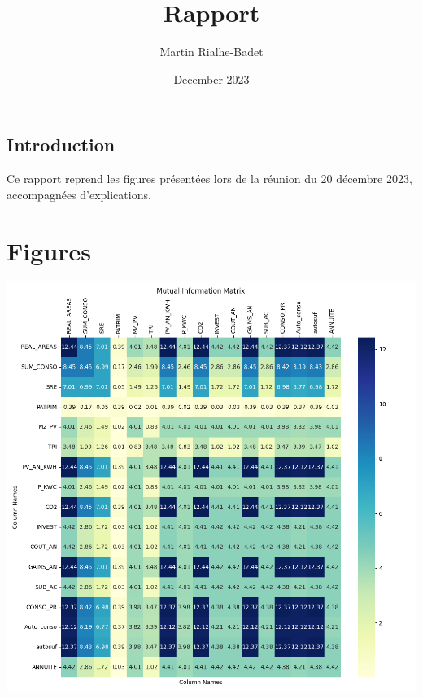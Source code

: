 \documentclass{article}
\title{Rapport}
\author{Martin Rialhe-Badet}
\date{December 2023}
\begin{document}
\maketitle

\newpage

\subsection*{Introduction}

Ce rapport reprend les figures présentées lors de la réunion du 20 décembre 2023, accompagnées d'explications.

\section{Figures}

\includegraphics[width=\textwidth]{figures/mutual_information_matrix.png}
\end{document}
